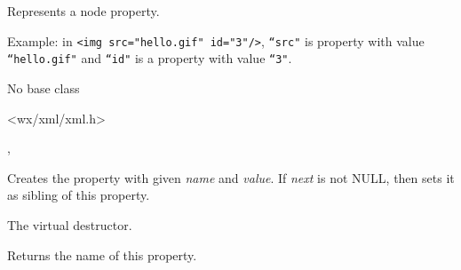 
\section{}\label{wxxmlattribute}

Represents a node property.

Example: in {\tt <img src="hello.gif" id="3"/>}, {\tt ``src"} is property with value
{\tt ``hello.gif"} and {\tt ``id"} is a property with value {\tt ``3"}.


No base class


<wx/xml/xml.h>


, 



\label{wxxmlattributewxxmlattribute}




Creates the property with given {\it name} and {\it value}.
If {\it next} is not NULL, then sets it as sibling of this property.

\label{wxxmlattributedtor}


The virtual destructor.

\label{wxxmlattributegetname}


Returns the name of this property.

\label{wxxmlattributegetnext}

